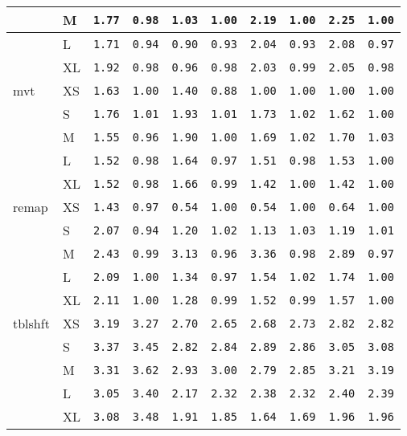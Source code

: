 \begin{tabular}{l | l | l | l | l | l | l | l | l | l}
             & M    & \verb|1.77| & \verb|0.98| & \verb|1.03| & \verb|1.00| & \verb|2.19| & \verb|1.00| & \verb|2.25| & \verb|1.00| \\ \hline
             & L    & \verb|1.71| & \verb|0.94| & \verb|0.90| & \verb|0.93| & \verb|2.04| & \verb|0.93| & \verb|2.08| & \verb|0.97| \\ \hline
             & XL   & \verb|1.92| & \verb|0.98| & \verb|0.96| & \verb|0.98| & \verb|2.03| & \verb|0.99| & \verb|2.05| & \verb|0.98| \\ \hline
    mvt      & XS   & \verb|1.63| & \verb|1.00| & \verb|1.40| & \verb|0.88| & \verb|1.00| & \verb|1.00| & \verb|1.00| & \verb|1.00| \\ \hline
             & S    & \verb|1.76| & \verb|1.01| & \verb|1.93| & \verb|1.01| & \verb|1.73| & \verb|1.02| & \verb|1.62| & \verb|1.00| \\ \hline
             & M    & \verb|1.55| & \verb|0.96| & \verb|1.90| & \verb|1.00| & \verb|1.69| & \verb|1.02| & \verb|1.70| & \verb|1.03| \\ \hline
             & L    & \verb|1.52| & \verb|0.98| & \verb|1.64| & \verb|0.97| & \verb|1.51| & \verb|0.98| & \verb|1.53| & \verb|1.00| \\ \hline
             & XL   & \verb|1.52| & \verb|0.98| & \verb|1.66| & \verb|0.99| & \verb|1.42| & \verb|1.00| & \verb|1.42| & \verb|1.00| \\ \hline
    remap    & XS   & \verb|1.43| & \verb|0.97| & \verb|0.54| & \verb|1.00| & \verb|0.54| & \verb|1.00| & \verb|0.64| & \verb|1.00| \\ \hline
             & S    & \verb|2.07| & \verb|0.94| & \verb|1.20| & \verb|1.02| & \verb|1.13| & \verb|1.03| & \verb|1.19| & \verb|1.01| \\ \hline
             & M    & \verb|2.43| & \verb|0.99| & \verb|3.13| & \verb|0.96| & \verb|3.36| & \verb|0.98| & \verb|2.89| & \verb|0.97| \\ \hline
             & L    & \verb|2.09| & \verb|1.00| & \verb|1.34| & \verb|0.97| & \verb|1.54| & \verb|1.02| & \verb|1.74| & \verb|1.00| \\ \hline
             & XL   & \verb|2.11| & \verb|1.00| & \verb|1.28| & \verb|0.99| & \verb|1.52| & \verb|0.99| & \verb|1.57| & \verb|1.00| \\ \hline
    tblshft  & XS   & \verb|3.19| & \verb|3.27| & \verb|2.70| & \verb|2.65| & \verb|2.68| & \verb|2.73| & \verb|2.82| & \verb|2.82| \\ \hline
             & S    & \verb|3.37| & \verb|3.45| & \verb|2.82| & \verb|2.84| & \verb|2.89| & \verb|2.86| & \verb|3.05| & \verb|3.08| \\ \hline
             & M    & \verb|3.31| & \verb|3.62| & \verb|2.93| & \verb|3.00| & \verb|2.79| & \verb|2.85| & \verb|3.21| & \verb|3.19| \\ \hline
             & L    & \verb|3.05| & \verb|3.40| & \verb|2.17| & \verb|2.32| & \verb|2.38| & \verb|2.32| & \verb|2.40| & \verb|2.39| \\ \hline
             & XL   & \verb|3.08| & \verb|3.48| & \verb|1.91| & \verb|1.85| & \verb|1.64| & \verb|1.69| & \verb|1.96| & \verb|1.96| \\ \hline
\end{tabular}
